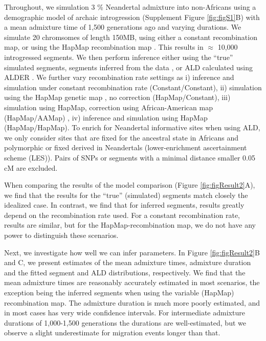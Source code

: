 \documentclass[11pt]{article}
\begin{document}
Throughout, we simulation 3 \% Neandertal admixture into non-Africans using a demographic model of archaic introgression (Supplement Figure \ref{fig:figS1}B) with a mean admixture time of 1,500 generations ago and varying durations.  We simulate 20 chromsomes of length 150MB, using either a constant recombination map, or using the HapMap recombination map \citep{HapMapConsortium_second_2007}. This results in $\approx$ 10,000 introgressed segments. We then perform inference either using the ``true'' simulated segments, segments inferred from the data \citep{skov_detecting_2018}, or ALD calculated using ALDER \citep{loh_inferring_2013}. We further vary recombination rate settings as i) inference and simulation under constant recombination rate (Constant/Constant), ii) simulation using the HapMap genetic map \citep{HapMapConsortium_second_2007}, no correction (HapMap/Constant), iii) simulation using HapMap, correction using African-American map (HapMap/AAMap) \citep{hinch_landscape_2011}, iv) inference and simulation using HapMap (HapMap/HapMap). To enrich for Neandertal informative sites when using ALD, we only consider sites that are fixed for the ancestral state in Africans and polymorphic or fixed derived in Neandertals (lower-enrichment ascertainment scheme (LES)). Pairs of SNPs or segments with a minimal distance smaller 0.05 cM are excluded.

When comparing the results of the model comparison (Figure \ref{fig:figResult2}A), we find that the results for the ``true'' (simulated) segments match closely the idealized case. In contrast, we find that for inferred segments, results greatly depend on the recombination rate used. For a constant recombination rate, results are similar, but for the HapMap-recombination map, we do not have any power to distinguish these scenarios. 


Next, we investigate how well we can infer parameters. In Figure \ref{fig:figResult2}B and C, we present estimates of the mean admixture times, admixture duration and the fitted segment and ALD distributions, respectively.  We find that the mean admixture times are reasonably accurately estimated in most scenarios, the exception being the inferred segments when using the variable (HapMap) recombination map. The admixture duration is much more poorly estimated, and in most cases has very wide confidence intervals. For intermediate admixture durations of 1,000-1,500 generations the durations are well-estimated, but we observe a slight underestimate for migration events longer than that.
 
\end{document}

